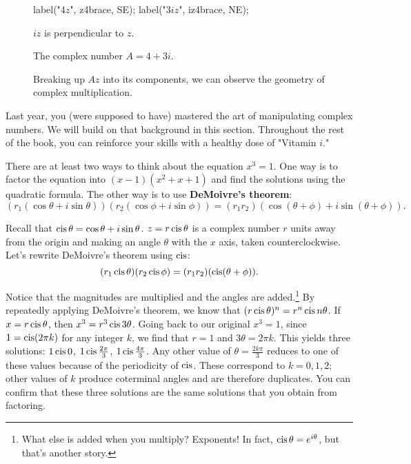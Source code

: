 \documentclass[../textbook.tex]{subfiles}
\begin{document}
\begin{figure}[h]
\begin{center}
\begin{minipage}[b]{0.4\textwidth}
\begin{asy}[width=0.7\textwidth]
				label("$4z$", z4brace, SE);
				label("$3iz$", iz4brace, NE);
			\end{asy}
		\end{minipage}
	\end{center}
	\vspace*{-2\baselineskip}
	\begin{center}
		\begin{minipage}[t]{0.25\textwidth}
			\caption{$iz$ is perpendicular to $z$.}
			\label{fig:izzperp}
		\end{minipage}
		\hfill
		\begin{minipage}[t]{0.25\textwidth}
			\caption{The complex number $A=4+3i$.}
			\label{fig:lol}
		\end{minipage}
		\hfill
		\begin{minipage}[t]{0.4\textwidth}
			\caption{Breaking up $Az$ into its components, we can observe the geometry of complex multiplication.}
		\end{minipage}
	\end{center}
	\vspace*{-2\baselineskip}
\end{figure}

\noindent Last year, you (were supposed to have) mastered the art of manipulating complex numbers. We will build on that background in this section. Throughout the rest of the book, you can reinforce your skills with a healthy dose of "Vitamin $i$."

There are at least two ways to think about the equation $x^3 = 1$. One way is to factor the equation into $(x-1)(x^2+x+1)$ and find the solutions using the quadratic formula. The other way is to use \textbf{DeMoivre’s theorem}:
\[(r_1 (\cos \theta + i \sin \theta)) (r_2 (\cos \phi + i \sin \phi)) = (r_1r_2) (\cos(\theta + \phi) + i \sin(\theta + \phi)).\]

Recall that $\operatorname{cis} \theta = \cos \theta + i \sin \theta$. $z=r\operatorname{cis} \theta$ is a complex number $r$ units away from the origin and making an angle $\theta$ with the $x$ axis, taken counterclockwise. Let’s rewrite DeMoivre’s theorem using $\operatorname{cis}$:
\[(r_1 \operatorname{cis} \theta)(r_2 \operatorname{cis} \phi) = (r_1r_2)(\operatorname{cis}(\theta + \phi)).\]

\noindent Notice that the magnitudes are multiplied and the angles are added.\footnote{What else is added when you multiply? Exponents! In fact, $\operatorname{cis} \theta = e^{i\theta}$, but that’s another story.} By repeatedly applying DeMoivre's theorem, we know that $(r \operatorname{cis} \theta) ^ n = r^n \operatorname{cis} n\theta$. If $x = r \operatorname{cis} \theta$, then $x^3 = r^3 \operatorname{cis} 3\theta$. Going back to our original $x^3 = 1$, since $1 = \operatorname{cis}(2\pi k)$ for any integer $k$, we find that $r = 1$ and $3\theta = 2\pi k$. This yields three solutions: $1 \operatorname{cis} 0$, $1 \operatorname{cis} \frac{2\pi}{3}$, $1 \operatorname{cis} \frac{4\pi}{3}$. Any other value of $\theta=\frac{2k\pi}{3}$ reduces to one of these values because of the periodicity of $\operatorname{cis}$. These correspond to $k = 0, 1, 2$; other values of $k$ produce coterminal angles and are therefore duplicates. You can confirm that these three solutions are the same solutions that you obtain from factoring.
\end{document}
